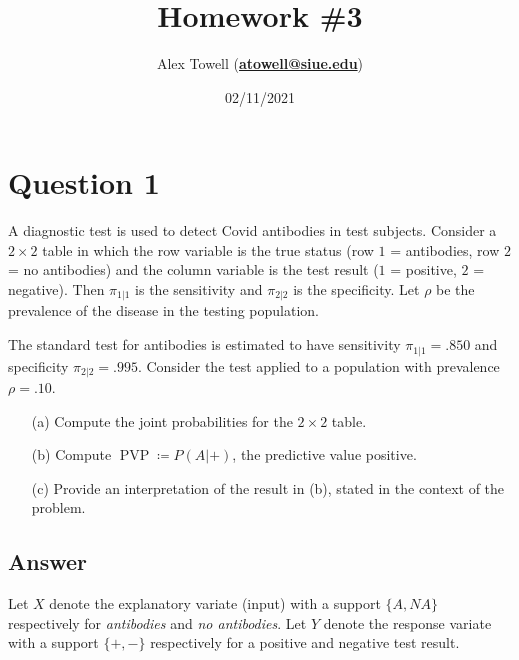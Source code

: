 \documentclass[10pt]{fphw}
\title{Homework \#3} %
\author{Alex Towell (\href{mailto:atowell@siue.edu}{\bfseries{atowell@siue.edu}})}
\date{02/11/2021} %
\institute{Southern Illinois University-Edwardsville}
\begin{document}
\maketitle %

\section*{Question 1}
\begin{problem}
A diagnostic test is used to detect Covid antibodies in test subjects. Consider a $2\times2$ table in which
the row variable is the true status (row $1$ = antibodies, row $2$ = no antibodies) and the column variable is the
test result ($1$ = positive, $2$ = negative). Then $\pi_{1|1}$ is the sensitivity and $\pi_{2|2}$ is the specificity.
Let $\rho$ be the prevalence of the disease in the testing population.

The standard test for antibodies is estimated to have sensitivity $\pi_{1|1} = .850$ and specificity $\pi_{2|2} = .995$.
Consider the test applied to a population with prevalence $\rho = .10$.

\begin{enumerate}
\item[(a)] Compute the joint probabilities for the $2 \times 2$ table.
\item[(b)] Compute $\operatorname{PVP} \coloneqq P(A|+)$, the predictive value positive.
\item[(c)] Provide an interpretation of the result in (b), stated in the context of the problem.
\end{enumerate}  
\end{problem}

\subsection*{Answer}
Let $X$ denote the explanatory variate (input) with a support $\{A,N\!A\}$ respectively for \emph{antibodies} and \emph{no antibodies}.
Let $Y$ denote the response variate with a support $\{+,-\}$ respectively for a positive and negative test result.
\end{document}
